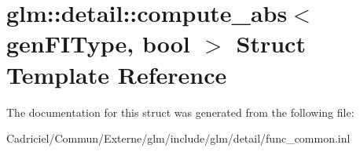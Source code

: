 \hypertarget{structglm_1_1detail_1_1compute__abs}{}\section{glm\+:\+:detail\+:\+:compute\+\_\+abs$<$ gen\+F\+I\+Type, bool $>$ Struct Template Reference}
\label{structglm_1_1detail_1_1compute__abs}


The documentation for this struct was generated from the following file\+:\begin{DoxyCompactItemize}
\item 
Cadriciel/\+Commun/\+Externe/glm/include/glm/detail/func\+\_\+common.\+inl\end{DoxyCompactItemize}
